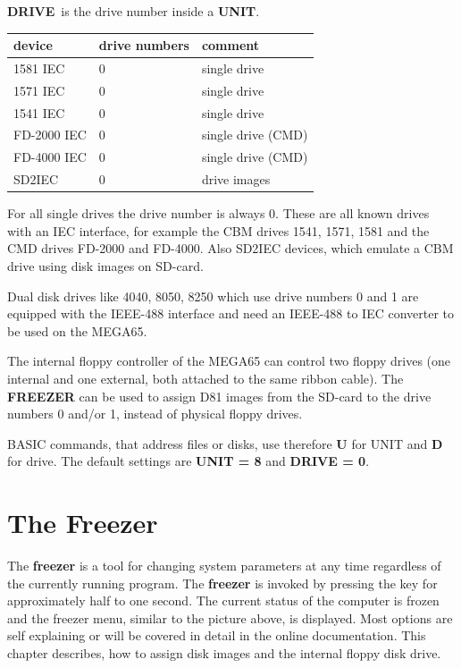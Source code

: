 {\bf DRIVE} is the drive number inside a {\bf UNIT}.

{\ttfamily
\setlength{\tabcolsep}{1mm}
\begin{tabular}{|l|l|l|}
\hline
 device  & drive numbers & comment \\
\hline
1581 IEC & 0             & single drive \\
1571 IEC & 0             & single drive \\
1541 IEC & 0             & single drive \\
FD-2000 IEC & 0             & single drive (CMD)\\
FD-4000 IEC & 0             & single drive (CMD)\\
SD2IEC      & 0             & drive images\\
\hline
\end{tabular}
}

For all single drives the drive number is always 0.
These are all known drives with an IEC interface, for example
the CBM drives 1541, 1571, 1581 and the CMD drives FD-2000 and FD-4000.
Also SD2IEC devices, which emulate a CBM drive using disk images on
SD-card.

Dual disk drives like 4040, 8050, 8250 which use drive numbers
0 and 1 are equipped with the IEEE-488 interface and need
an IEEE-488 to IEC converter to be used on the MEGA65.

The internal floppy controller of the MEGA65 can control
two floppy drives (one internal and one external, both attached to the same
ribbon cable). The {\bf FREEZER} can be used to assign D81 images from the
SD-card to the drive numbers 0 and/or 1, instead of physical floppy drives.

BASIC commands, that address files or disks, use therefore
{\bf U} for UNIT and {\bf D} for drive.
The default settings are {\bf UNIT = 8} and {\bf DRIVE = 0}.

\section{The Freezer}
The {\bf freezer} is a tool for changing system parameters at any time
regardless of the currently running program. The {\bf freezer} is invoked
by pressing the  key for approximately half to one second.
The current status of the computer is frozen and the freezer menu,
similar to the picture above, is displayed.
Most options are self explaining or will be covered in detail in the
online documentation. This chapter describes, how to assign disk images
and the internal floppy disk drive.

